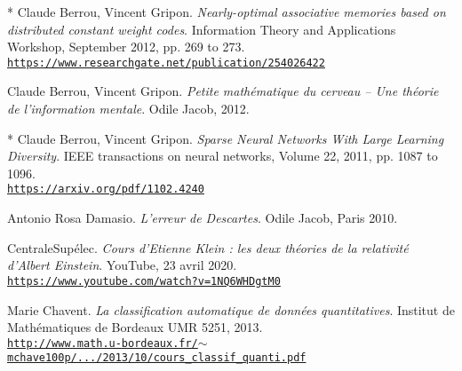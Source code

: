 \vspace{-1cm}
\renewcommand{\refname}{}

\renewcommand\bibpreamble{$\rightarrow$ The references to go further or deeper for advanced readers are prepended by an asterisk.\bigskip}

\begin{thebibliography}{99}
		
	 * Claude Berrou, Vincent Gripon. \textit{Nearly-optimal associative memories based on distributed constant weight codes}. Information Theory and Applications Workshop, September 2012, pp. 269 to 273.\\ \href{https://www.researchgate.net/publication/254026422\_Nearly-optimal\_associative\_memories\_based\_on\_distributed\_constant\_weight\_codes}{\scriptsize{\texttt{https://www.researchgate.net/publication/254026422}}} \normalsize{}
	
	Claude Berrou, Vincent Gripon. \textit{Petite mathématique du cerveau -- Une théorie de l’information mentale}. Odile Jacob, 2012.
	
	 * Claude Berrou, Vincent Gripon. \textit{Sparse Neural Networks With Large Learning Diversity}. IEEE transactions on neural networks, Volume 22, 2011, pp. 1087 to 1096.\\ \href{https://arxiv.org/pdf/1102.4240}{\scriptsize{\texttt{https://arxiv.org/pdf/1102.4240}}} \normalsize{}
	 
	 Antonio Rosa Damasio. \textit{L'erreur de Descartes}. Odile Jacob, Paris 2010.
	 	 
	 CentraleSupélec. \textit{Cours d'Etienne Klein : les deux théories de la relativité d'Albert Einstein}. 
	 YouTube, 23 avril 2020. \\ \href{https://www.youtube.com/watch?v=1NQ6WHDgtM0}{\scriptsize{\texttt{https://www.youtube.com/watch?v=1NQ6WHDgtM0}}} \normalsize{}
	 
	 Marie Chavent. \textit{La classification automatique de données quantitatives}. 
	 Institut de Mathématiques de Bordeaux UMR 5251, 2013.\\ \href{http://www.math.u-bordeaux.fr/\~mchave100p/wordpress/wp-content/uploads/2013/10/cours\_classif\_quanti.pdf}{\scriptsize{\texttt{http://www.math.u-bordeaux.fr/$\sim$mchave100p/.../2013/10/cours\_classif\_quanti.pdf}}} \normalsize{}
	 

\end{thebibliography}
